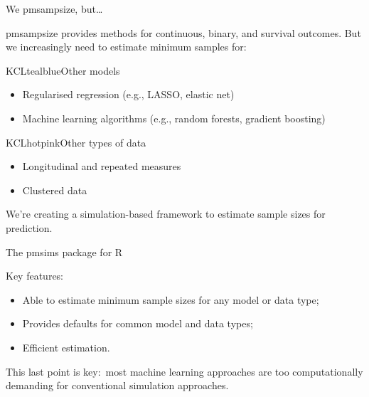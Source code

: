 \documentclass[11pt]{beamer}
\newcommand*{\img}[1]{%
    \raisebox{-.3\baselineskip}{%
        \texttt{[image: \#1]}%
    }%
}
\begin{document}
\begin{frame}[c]{We \img{figures/heart.png} pmsampsize, but\ldots}
	\large

	pmsampsize provides methods for continuous, binary, and survival
	outcomes. But we increasingly need to estimate minimum samples for:

	\begin{cbox}{KCLtealblue}{Other models}
		\begin{itemize}
			\item Regularised regression (e.g., LASSO, elastic net)
			\item Machine learning algorithms (e.g., random forests, gradient
			      boosting)
		\end{itemize}
	\end{cbox}

	\begin{cbox}{KCLhotpink}{Other types of data}{}
		\begin{itemize}
			\item Longitudinal and repeated measures
			\item Clustered data
		\end{itemize}
	\end{cbox}

	We're creating a simulation-based framework to estimate sample sizes for
	prediction.

\end{frame}

\begin{frame}[t]{The \alert{pmsims} package for R}

	Key features:

	\begin{itemize}
		\item Able to estimate minimum sample sizes for \alert{any model or
		      data type};
		\item Provides defaults for common model and data types;
		\item Efficient estimation.
	\end{itemize}

	This last point is key:\ most machine learning approaches are too
	computationally demanding for conventional simulation approaches.

\end{frame}
\end{document}
